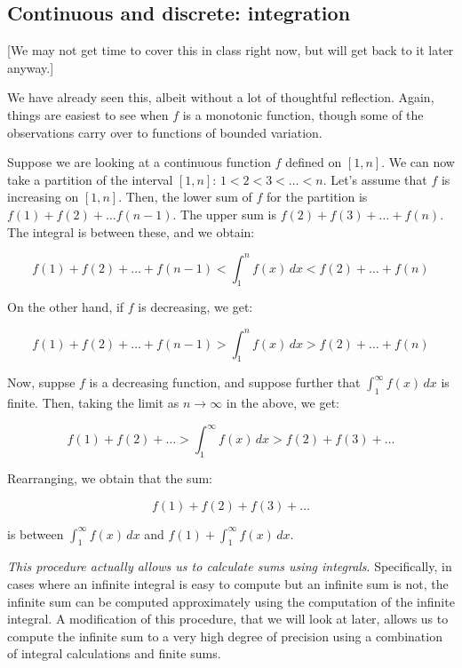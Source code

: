 \documentclass[10pt]{amsart}
\begin{document}
\subsection{Continuous and discrete: integration}

[We may not get time to cover this in class right now, but will get
back to it later anyway.]
 
We have already seen this, albeit without a lot of thoughtful
reflection. Again, things are easiest to see when $f$ is a monotonic
function, though some of the observations carry over to functions of
bounded variation.

Suppose we are looking at a continuous function $f$ defined on
$[1,n]$. We can now take a partition of the interval $[1,n]$: $1 < 2 <
3 < \dots < n$. Let's assume that $f$ is increasing on $[1,n]$. Then,
the lower sum of $f$ for the partition is $f(1) + f(2) + \dots f(n -
1)$. The upper sum is $f(2) + f(3) + \dots + f(n)$. The integral is
between these, and we obtain:

$$f(1) + f(2) + \dots + f(n-1) < \int_1^n f(x) \, dx < f(2) + \dots + f(n)$$

On the other hand, if $f$ is decreasing, we get:

$$f(1) + f(2) + \dots + f(n-1) > \int_1^n f(x) \, dx > f(2) + \dots + f(n)$$

Now, suppse $f$ is a decreasing function, and suppose further that
$\int_1^\infty f(x) \, dx$ is finite. Then, taking the limit as $n \to
\infty$ in the above, we get:

$$f(1) + f(2) + \dots > \int_1^\infty f(x) \, dx > f(2) + f(3) + \dots $$

Rearranging, we obtain that the sum:

$$f(1) + f(2) + f(3) + \dots $$

is between $\int_1^{\infty} f(x) \, dx$ and $f(1) + \int_1^\infty f(x)
\, dx$.

{\em This procedure actually allows us to calculate sums using
integrals}. Specifically, in cases where an infinite integral is easy
to compute but an infinite sum is not, the infinite sum can be
computed approximately using the computation of the infinite
integral. A modification of this procedure, that we will look at
later, allows us to compute the infinite sum to a very high degree of
precision using a combination of integral calculations and finite
sums.
\end{document}
